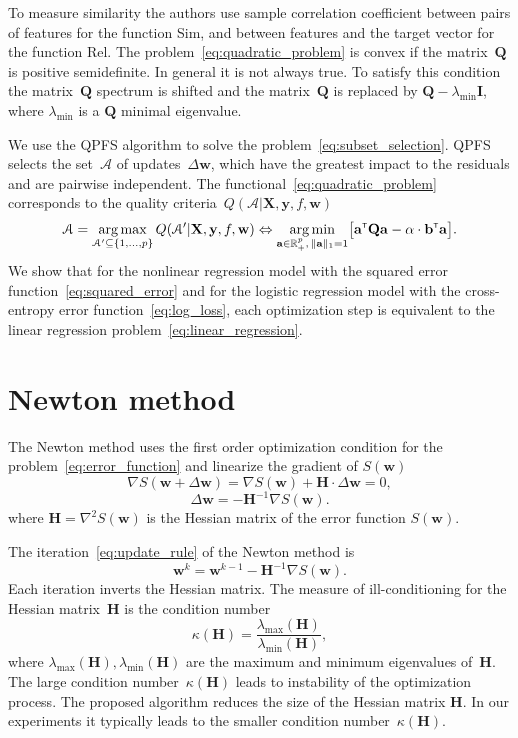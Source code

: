 \documentclass[
11pt,%
tightenlines,%
twoside,%
onecolumn,%
nofloats,%
nobibnotes,%
nofootinbib,%
superscriptaddress,%
noshowpacs,%
centertags]%
{revtex4}
\newcommand{\ba}{\mathbf{a}}
\newcommand{\bw}{\mathbf{w}}
\newcommand{\by}{\mathbf{y}}
\newcommand{\cA}{\mathcal{A}}
\newcommand{\bQ}{\mathbf{Q}}
\newcommand{\bbR}{\mathbb{R}}
\newcommand{\bH}{\mathbf{H}}
\newcommand{\bX}{\mathbf{X}}
\newcommand{\T}{{\text{\tiny\sffamily\upshape\mdseries T}}}
\newcommand{\argmin}{\mathop{\arg \min}\limits}
\newcommand{\argmax}{\mathop{\arg \max}\limits}
\begin{document}
To measure similarity the authors use sample correlation coefficient between pairs of features for the function Sim, and between features and the target vector for the function Rel.
The problem~\eqref{eq:quadratic_problem} is convex if the matrix~$\bQ$ is positive semidefinite. In general it is not always true. 
To satisfy this condition the matrix~$\bQ$ spectrum is shifted and the matrix~$\bQ$ is replaced by $\bQ - \lambda_{\text{min}} \mathbf{I}$, where $\lambda_{\text{min}} $ is a $\bQ$ minimal eigenvalue.

We use the QPFS algorithm to solve the problem~\eqref{eq:subset_selection}.
QPFS selects the set~$\cA$ of updates~$\Delta \bw$, which have the greatest impact to the residuals and are pairwise independent.
The functional~\eqref{eq:quadratic_problem} corresponds to the quality criteria~$Q(\cA | \bX, \by, f, \bw)$
\begin{equation}
\cA = \argmax_{\cA' \subseteq \{1, \dots, p\}} Q(\cA' | \bX, \by, f, \bw) \Leftrightarrow \argmin_{\ba  \in \bbR^p_+, \, \|\ba\|_1=1} \bigl[\ba^{\T} \bQ \ba - \alpha \cdot \mathbf{b}^{\T} \ba \bigr].
\end{equation}
We show that for the nonlinear regression model with the squared error function~\eqref{eq:squared_error} and for the logistic regression model with the cross-entropy error function~\eqref{eq:log_loss}, each optimization step is equivalent to the linear regression problem~\eqref{eq:linear_regression}.

\section{Newton method}	
The Newton method uses the first order optimization condition for the problem~\eqref{eq:error_function} and linearize the gradient of $S(\bw)$
\[
\nabla S (\bw + \Delta \bw) = \nabla S(\bw) + \bH \cdot \Delta \bw = 0,
\]
\[
\Delta \bw = - \bH^{-1} \nabla S(\bw).
\]
where $\bH = \nabla^2 S(\bw)$ is the Hessian matrix of the error function $S(\bw)$.

The iteration~\eqref{eq:update_rule} of the Newton method is
\[
\bw^k = \bw^{k-1} - \bH^{-1} \nabla S(\bw).
\]
Each iteration inverts the Hessian matrix.
The measure of ill-conditioning for the Hessian matrix~$\bH$ is the condition number
\[
\kappa(\bH) = \frac{\lambda_{\text{max}}(\bH)}{\lambda_{\text{min}}(\bH)},
\]
where $\lambda_{\text{max}}(\bH), \lambda_{\text{min}}(\bH)$ are the maximum and minimum eigenvalues of~$\bH$. The large condition number~$\kappa(\bH)$ leads to instability of the optimization process.
The proposed algorithm reduces the size of the Hessian matrix $\bH$. In our experiments it typically leads to the smaller condition number~$\kappa(\bH)$.
\end{document}
